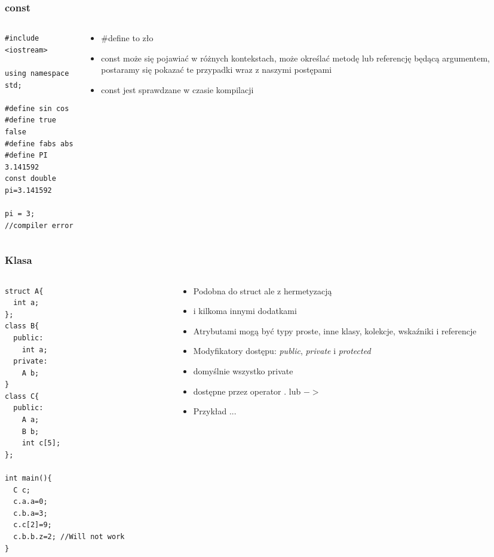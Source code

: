 \documentclass[10pt]{beamer}
\begin{document}
\begin{frame}[fragile]
  \frametitle{const}
  \begin{columns}
    \begin{column}{0.48\textwidth}
      \begin{lstlisting}
#include <iostream>

using namespace std;

#define sin cos
#define true false
#define fabs abs
#define PI 3.141592
const double pi=3.141592

pi = 3; //compiler error
\end{lstlisting}
    \end{column}
    \begin{column}{0.48\textwidth}
      \begin{itemize}
        \item \#define to zło
        \item const może się pojawiać w różnych kontekstach, może określać metodę lub referencję będącą argumentem, postaramy się pokazać te przypadki wraz z naszymi postępami
        \item const jest sprawdzane w czasie kompilacji
      \end{itemize}
    \end{column}
  \end{columns}
\end{frame}

\begin{frame}[fragile]
  \frametitle{Klasa}
  \begin{columns}
    \begin{column}{0.48\textwidth}
\begin{lstlisting}
struct A{
  int a;
};
class B{
  public:
    int a;
  private:
    A b;
}
class C{
  public:
    A a;
    B b;
    int c[5];
};

int main(){
  C c;
  c.a.a=0;
  c.b.a=3;
  c.c[2]=9;
  c.b.b.z=2; //Will not work
}
\end{lstlisting}
    \end{column}
    \begin{column}{0.48\textwidth}
      \begin{itemize}
        \item Podobna do struct ale z hermetyzacją
        \item i kilkoma innymi dodatkami
        \item Atrybutami mogą być typy proste, inne klasy, kolekcje, wskaźniki i referencje
        \item Modyfikatory dostępu: \textit{public}, \textit{private} i \textit{protected}
        \item domyślnie wszystko private
        \item dostępne przez operator . lub $->$
        \item Przykład ...
      \end{itemize}
    \end{column}
  \end{columns}
\end{frame}
\end{document}
